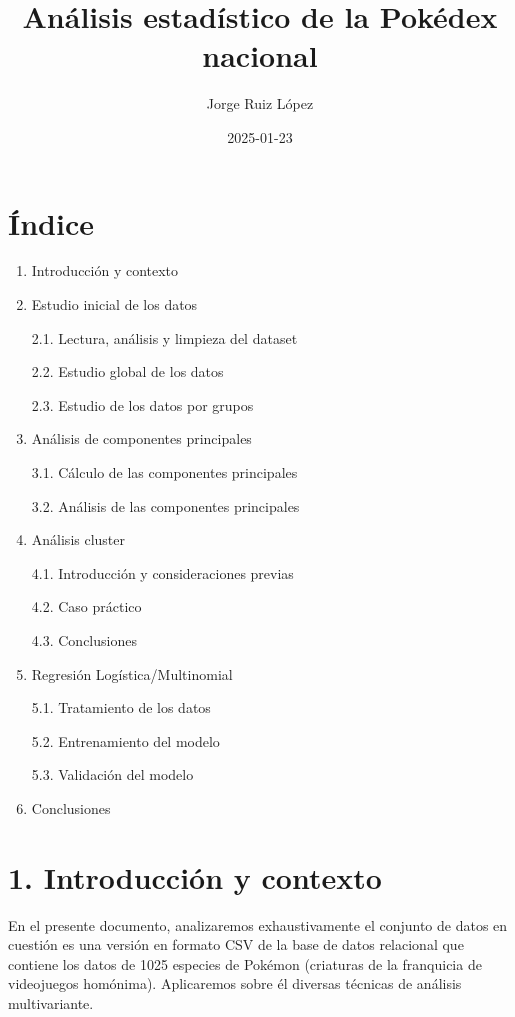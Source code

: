 \documentclass[
  12pt,
]{extreport}
\title{Análisis estadístico de la Pokédex nacional}
\author{Jorge Ruiz López}
\date{2025-01-23}
\begin{document}
\maketitle


\maketitle

\chapter{Índice}\label{uxedndice}

\begin{enumerate}
\def\labelenumi{\arabic{enumi}.}
\item
  Introducción y contexto
\item
  Estudio inicial de los datos

  2.1. Lectura, análisis y limpieza del dataset

  2.2. Estudio global de los datos

  2.3. Estudio de los datos por grupos
\item
  Análisis de componentes principales

  3.1. Cálculo de las componentes principales

  3.2. Análisis de las componentes principales
\item
  Análisis cluster

  4.1. Introducción y consideraciones previas

  4.2. Caso práctico

  4.3. Conclusiones
\item
  Regresión Logística/Multinomial

  5.1. Tratamiento de los datos

  5.2. Entrenamiento del modelo

  5.3. Validación del modelo
\item
  Conclusiones
\end{enumerate}

\chapter{1. Introducción y contexto}\label{introducciuxf3n-y-contexto}

En el presente documento, analizaremos exhaustivamente el conjunto de
datos en cuestión es una versión en formato CSV de la base de datos
relacional que contiene los datos de 1025 especies de Pokémon (criaturas
de la franquicia de videojuegos homónima). Aplicaremos sobre él diversas
técnicas de análisis multivariante.
\end{document}
